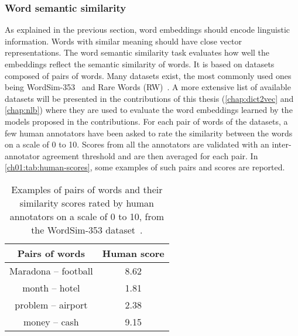     \subsubsection{Word semantic similarity}
      \label{ch01:subsubsec:semantic-similarity}
      As explained in the previous section, word embeddings should encode
      linguistic information. Words with similar meaning should have close
      vector representations. The word semantic similarity task evaluates how
      well the embeddings reflect the semantic similarity of words. It is based
      on datasets composed of pairs of words. Many datasets exist, the most
      commonly used ones being WordSim-353~\citep{finkelstein2001placing} and
      Rare Words (RW)~\citep{luong2013better}. A more extensive list of
      available datasets will be presented in the contributions of this thesis
      (\autoref{chap:dict2vec} and \autoref{chap:nlb}) where they are used to
      evaluate the word embeddings learned by the models proposed in the
      contributions. For each pair of words of the datasets, a few human
      annotators have been asked to rate the similarity between the words on a
      scale of 0 to 10. Scores from all the annotators are validated with an
      inter-annotator agreement threshold and are then averaged for each pair.
      In \autoref{ch01:tab:human-scores}, some examples of such pairs and scores
      are reported.

      \begin{table}[h!]
        \centering
        \begin{tabular}{cc}
          \toprule[0.15em]
          Pairs of words & Human score\\
          \midrule
          Maradona -- football & 8.62 \\
          month -- hotel & 1.81\\
          problem -- airport & 2.38 \\
          money -- cash & 9.15\\
          \bottomrule[0.15em]
        \end{tabular}
        \caption[Examples of pairs of words and their human similarity
        scores.]{Examples of pairs of words and their similarity scores rated by
        human annotators on a scale of 0 to 10, from the WordSim-353
        dataset~\citep{finkelstein2001placing}.}
        \label{ch01:tab:human-scores}
      \end{table}

